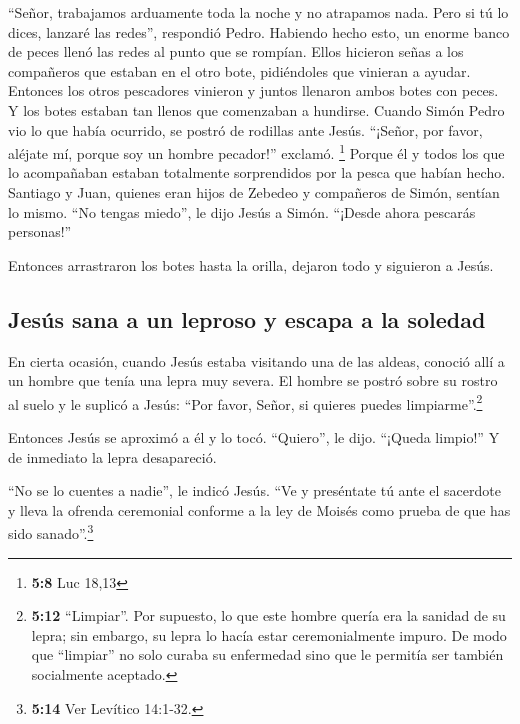  ``Señor, trabajamos arduamente toda la noche y no
atrapamos nada. Pero si tú lo dices, lanzaré las redes'', respondió
Pedro.  Habiendo hecho esto, un enorme banco de peces
llenó las redes al punto que se rompían.  Ellos hicieron
señas a los compañeros que estaban en el otro bote, pidiéndoles que
vinieran a ayudar. Entonces los otros pescadores vinieron y juntos
llenaron ambos botes con peces. Y los botes estaban tan llenos que
comenzaban a hundirse.  Cuando Simón Pedro vio lo que
había ocurrido, se postró de rodillas ante Jesús. ``¡Señor, por favor,
aléjate mí, porque soy un hombre pecador!'' exclamó. \footnote{\textbf{5:8}
  Luc 18,13}  Porque él y todos los que lo acompañaban
estaban totalmente sorprendidos por la pesca que habían hecho.
 Santiago y Juan, quienes eran hijos de Zebedeo y
compañeros de Simón, sentían lo mismo. ``No tengas miedo'', le dijo
Jesús a Simón. ``¡Desde ahora pescarás personas!''

 Entonces arrastraron los botes hasta la orilla, dejaron
todo y siguieron a Jesús.

\hypertarget{jesuxfas-sana-a-un-leproso-y-escapa-a-la-soledad}{%
\subsection{Jesús sana a un leproso y escapa a la
soledad}\label{jesuxfas-sana-a-un-leproso-y-escapa-a-la-soledad}}

 En cierta ocasión, cuando Jesús estaba visitando una de
las aldeas, conoció allí a un hombre que tenía una lepra muy severa. El
hombre se postró sobre su rostro al suelo y le suplicó a Jesús: ``Por
favor, Señor, si quieres puedes limpiarme''.\footnote{\textbf{5:12}
  ``Limpiar''. Por supuesto, lo que este hombre quería era la sanidad de
  su lepra; sin embargo, su lepra lo hacía estar ceremonialmente impuro.
  De modo que ``limpiar'' no solo curaba su enfermedad sino que le
  permitía ser también socialmente aceptado.}

 Entonces Jesús se aproximó a él y lo tocó. ``Quiero'',
le dijo. ``¡Queda limpio!'' Y de inmediato la lepra desapareció.

 ``No se lo cuentes a nadie'', le indicó Jesús. ``Ve y
preséntate tú ante el sacerdote y lleva la ofrenda ceremonial conforme a
la ley de Moisés como prueba de que has sido sanado''.\footnote{\textbf{5:14}
  Ver Levítico 14:1-32.}

